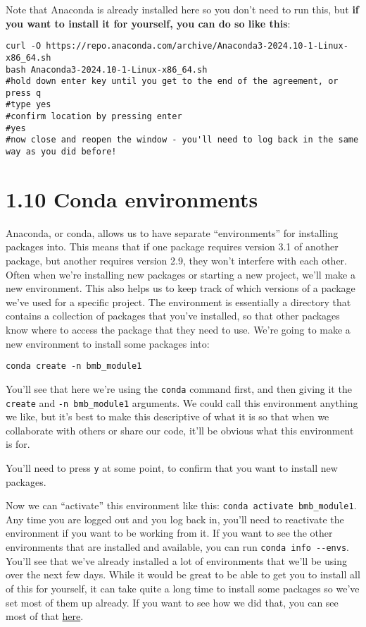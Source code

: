 \documentclass[
]{book}
\begin{document}
Note that Anaconda is already installed here so you don't need to run this, but \textbf{if you want to install it for yourself, you can do so like this}:

\begin{verbatim}
curl -O https://repo.anaconda.com/archive/Anaconda3-2024.10-1-Linux-x86_64.sh
bash Anaconda3-2024.10-1-Linux-x86_64.sh
#hold down enter key until you get to the end of the agreement, or press q
#type yes
#confirm location by pressing enter
#yes
#now close and reopen the window - you'll need to log back in the same way as you did before!
\end{verbatim}

\section{1.10 Conda environments}\label{conda-environments}

Anaconda, or conda, allows us to have separate ``environments'' for installing packages into. This means that if one package requires version 3.1 of another package, but another requires version 2.9, they won't interfere with each other. Often when we're installing new packages or starting a new project, we'll make a new environment. This also helps us to keep track of which versions of a package we've used for a specific project. The environment is essentially a directory that contains a collection of packages that you've installed, so that other packages know where to access the package that they need to use. We're going to make a new environment to install some packages into:

\begin{verbatim}
conda create -n bmb_module1
\end{verbatim}

You'll see that here we're using the \texttt{conda} command first, and then giving it the \texttt{create} and \texttt{-n\ bmb\_module1} arguments. We could call this environment anything we like, but it's best to make this descriptive of what it is so that when we collaborate with others or share our code, it'll be obvious what this environment is for.

You'll need to press \texttt{y} at some point, to confirm that you want to install new packages.

Now we can ``activate'' this environment like this: \texttt{conda\ activate\ bmb\_module1}.
Any time you are logged out and you log back in, you'll need to reactivate the environment if you want to be working from it. If you want to see the other environments that are installed and available, you can run \texttt{conda\ info\ -\/-envs}. You'll see that we've already installed a lot of environments that we'll be using over the next few days. While it would be great to be able to get you to install all of this for yourself, it can take quite a long time to install some packages so we've set most of them up already. If you want to see how we did that, you can see most of that \href{https://github.com/LangilleLab/microbiome_helper/wiki/CBW-2024:-Initial-setup-of-environments}{here}.
\end{document}
